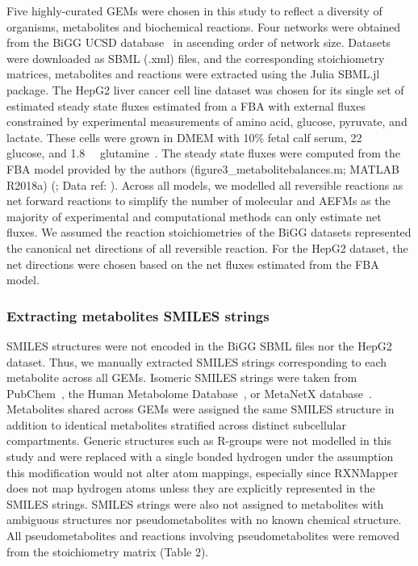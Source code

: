 \documentclass[12pt]{article}
\begin{document}
Five highly-curated GEMs were chosen in this study to reflect a diversity
of organisms, metabolites and biochemical reactions. Four networks were
obtained from the BiGG UCSD database~\citep{KingZacharyA2016BMAp} in
ascending order of network size. Datasets were downloaded as SBML (.xml)
files, and the corresponding stoichiometry matrices, metabolites and
reactions were extracted using the Julia SBML.jl package. The HepG2 liver
cancer cell line dataset was chosen for its single set of estimated steady
state fluxes estimated from a FBA with external fluxes constrained by
experimental measurements of amino acid, glucose, pyruvate, and lactate.
These cells were grown in DMEM with 10\% fetal calf serum,
22\SI{}{\milli\molar} glucose, and 1.8\SI{}{\milli\molar}
glutamine~\citep{NilssonAvlant2020Qaoa}. The steady state fluxes were computed
from the FBA model provided by the authors (figure3\_metabolitebalances.m;
MATLAB R2018a) (\citealt{NilssonAvlant2020Qaoa}; Data ref:
\citealt{NilssonAvlant2020QaoaDATASET}). Across all models, we modelled all
reversible reactions as net forward reactions to simplify the number of
molecular and AEFMs as the majority of experimental and computational methods
can only estimate net fluxes. We assumed the reaction stoichiometries of the
BiGG datasets represented the canonical net directions of all reversible
reaction. For the HepG2 dataset, the net directions were chosen based on the
net fluxes estimated from the FBA model.

\subsubsection*{Extracting metabolites SMILES strings}

SMILES structures were not encoded in the BiGG SBML files nor the HepG2
dataset. Thus, we manually extracted SMILES strings corresponding to each
metabolite across all GEMs. Isomeric SMILES strings were taken from
PubChem~\citep{KimSunghwan2023P2u}, the Human Metabolome
Database~\citep{WishartDavidS2022H5tH}, or MetaNetX
database~\citep{MorettiSebastien2021Munf}. Metabolites shared across GEMs
were assigned the same SMILES structure in addition to identical
metabolites stratified across distinct subcellular compartments. Generic
structures such as R-groups were not modelled in this study and were
replaced with a single bonded hydrogen under the assumption this
modification would not alter atom mappings, especially since RXNMapper
does not map hydrogen atoms unless they are explicitly represented in the
SMILES strings. SMILES strings were also not assigned to metabolites with
ambiguous structures nor pseudometabolites with no known chemical
structure. All pseudometabolites and reactions involving pseudometabolites
were removed from the stoichiometry matrix (Table 2).
\end{document}

